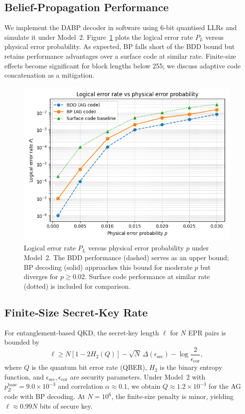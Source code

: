 \documentclass[conference]{IEEEtran}
\begin{document}
\subsection{Belief‑Propagation Performance}
We implement the DABP decoder in software using 6‑bit quantised LLRs and simulate it under Model 2.  Figure~\ref{fig:ber} plots the logical error rate $P_L$ versus physical error probability.  As expected, BP falls short of the BDD bound but retains performance advantages over a surface code at similar rate.  Finite‑size effects become significant for block lengths below 255; we discuss adaptive code concatenation as a mitigation.

\begin{figure}[t]
\centering
\includegraphics[width=0.85\linewidth]{logical_error_rate.png}
\caption{Logical error rate $P_L$ versus physical error probability $p$ under Model 2.  The BDD performance (dashed) serves as an upper bound; BP decoding (solid) approaches this bound for moderate $p$ but diverges for $p\ge0.02$.  Surface code performance at similar rate (dotted) is included for comparison.}
\label{fig:ber}
\end{figure}

\subsection{Finite‑Size Secret‑Key Rate}
For entanglement‑based QKD, the secret‑key length $\ell$ for $N$ EPR pairs is bounded by
\begin{equation}
\ell \ge N[1-2H_2(Q)]-\sqrt{N}\,\Delta(\epsilon_{\mathrm{sec}}) - \log \frac{2}{\epsilon_{\mathrm{cor}}},
\end{equation}
where $Q$ is the quantum bit error rate (QBER), $H_2$ is the binary entropy function, and $\epsilon_{\mathrm{sec}}, \epsilon_{\mathrm{cor}}$ are security parameters.  Under Model 2 with $p_Z^{\mathrm{base}}=9.0\times 10^{-3}$ and correlation $\alpha\approx 0.1$, we obtain $Q\approx 1.2\times 10^{-3}$ for the AG code with BP decoding.  At $N=10^6$, the finite‑size penalty is minor, yielding $\ell\approx 0.99N$ bits of secure key.
\end{document}
